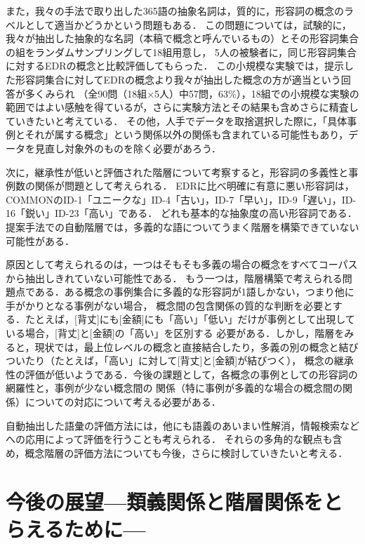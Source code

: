\documentclass[japanese]{jnlp_1.4}
\begin{document}
また，我々の手法で取り出した365語の抽象名詞は，質的に，形容詞の概念のラベルとして適当かどうかという問題もある．
この問題については，試験的に，我々が抽出した抽象的な名詞（本稿で概念と呼んでいるもの）とその形容詞集合の組をランダムサンプリングして18組用意し，
5人の被験者に，同じ形容詞集合に対するEDRの概念と比較評価してもらった．
この小規模な実験では，提示した形容詞集合に対してEDRの概念より我々が抽出した概念の方が適当という回答が多くみられ
（全90問（18組×5人）中57問，63\%），18組での小規模な実験の範囲ではよい感触を得ているが，さらに実験方法とその結果も含めさらに精査していきたいと考えている．
その他，人手でデータを取捨選択した際に，「具体事例とそれが属する概念」という関係以外の関係も含まれている可能性もあり，データを見直し対象外のものを除く必要があろう．

次に，継承性が低いと評価された階層について考察すると，形容詞の多義性と事例数の関係が問題として考えられる．
EDRに比べ明確に有意に悪い形容詞は，COMMONのID-1「ユニークな」ID-4「古い」，ID-7「早い」，ID-9「遅い」，ID-16「鋭い」ID-23「高い」である．
どれも基本的な抽象度の高い形容詞である．提案手法での自動階層では，多義的な語についてうまく階層を構築できていない可能性がある．

原因として考えられるのは，一つはそもそも多義の場合の概念をすべてコーパスから抽出しきれていない可能性である．
もう一つは，階層構築で考えられる問題点である．ある概念の事例集合に多義的な形容詞が1語しかない，つまり他に手がかりとなる事例がない場合，
概念間の包含関係の質的な判断を必要とする．たとえば，[背丈]にも[金額]にも「高い」「低い」だけが事例として出現している場合，[背丈]と[金額]の「高い」を区別する
必要がある．しかし，階層をみると，現状では，最上位レベルの概念と直接結合したり，多義の別の概念と結びついたり（たとえば，「高い」に対して[背丈]と[金額]が結びつく），
概念の継承性の評価が低いようである．今後の課題として，各概念の事例としての形容詞の網羅性と，事例が少ない概念間の
関係（特に事例が多義的な場合の概念間の関係）についての対応について考える必要がある．

自動抽出した語彙の評価方法には，他にも語義のあいまい性解消，情報検索などへの応用によって評価を行うことも考えられる．
それらの多角的な観点も含め，概念階層の評価方法についても今後，さらに検討していきたいと考える．



\section{今後の展望—類義関係と階層関係をとらえるために—}
\end{document}
